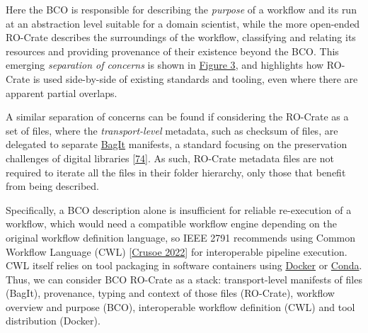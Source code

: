 Here the BCO is responsible for describing the \emph{purpose} of a
workflow and its run at an abstraction level suitable for a domain
scientist, while the more open-ended RO-Crate describes the surroundings
of the workflow, classifying and relating its resources and providing
provenance of their existence beyond the BCO. This emerging
\emph{separation of concerns} is shown in
\protect\hyperlink{fig:sep_concerns}{Figure 3}, and highlights how
RO-Crate is used side-by-side of existing standards and tooling, even
where there are apparent partial overlaps.

A similar separation of concerns can be found if considering the
RO-Crate as a set of files, where the \emph{transport-level} metadata,
such as checksum of files, are delegated to separate
\href{https://www.researchobject.org/ro-crate/1.1/appendix/implementation-notes.html\#adding-ro-crate-to-bagit}{BagIt}
manifests, a standard focusing on the preservation challenges of digital
libraries {[}\href{https://doi.org/10.17487/rfc8493}{74}{]}. As such,
RO-Crate metadata files are not required to iterate all the files in
their folder hierarchy, only those that benefit from being described.

Specifically, a BCO description alone is insufficient for reliable
re-execution of a workflow, which would need a compatible workflow
engine depending on the original workflow definition language, so IEEE
2791 recommends using Common Workflow Language (CWL)
{[}\href{https://doi.org/10.1145/3486897}{Crusoe 2022}{]} for interoperable
pipeline execution. CWL itself relies on tool packaging in software
containers using \href{https://www.docker.com/}{Docker} or
\href{https://docs.conda.io/}{Conda}. Thus, we can consider BCO RO-Crate
as a stack: transport-level manifests of files (BagIt), provenance,
typing and context of those files (RO-Crate), workflow overview and
purpose (BCO), interoperable workflow definition (CWL) and tool
distribution (Docker).

